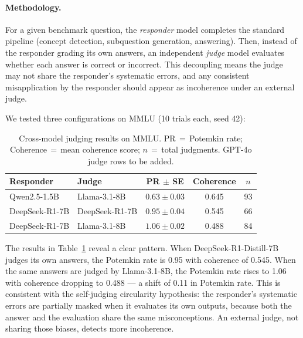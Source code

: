 \documentclass[sigconf,authordraft]{acmart}
\begin{document}
\paragraph{Methodology.} For a given benchmark question, the \emph{responder} model completes the standard pipeline (concept detection, subquestion generation, answering). Then, instead of the responder grading its own answers, an independent \emph{judge} model evaluates whether each answer is correct or incorrect. This decoupling means the judge may not share the responder's systematic errors, and any consistent misapplication by the responder should appear as incoherence under an external judge.

We tested three configurations on MMLU (10 trials each, seed 42):

\begin{table}[t]
\centering
\small
\setlength{\tabcolsep}{3pt}
\renewcommand{\arraystretch}{1.15}
\begin{tabular}{l l c c c}
\toprule
\textbf{Responder} & \textbf{Judge} & \textbf{PR $\pm$ SE} & \textbf{Coherence} & \textbf{$n$} \\
\midrule
Qwen2.5-1.5B & Llama-3.1-8B & $0.63 \pm 0.03$ & 0.645 & 93 \\
DeepSeek-R1-7B & DeepSeek-R1-7B & $0.95 \pm 0.04$ & 0.545 & 66 \\
DeepSeek-R1-7B & Llama-3.1-8B & $1.06 \pm 0.02$ & 0.488 & 84 \\
\midrule
\bottomrule
\end{tabular}
\caption{Cross-model judging results on MMLU. PR\,$=$\,Potemkin rate; Coherence\,$=$\,mean coherence score; $n$\,$=$\,total judgments. GPT-4o judge rows to be added.}
\label{tab:cross-judge}
\end{table}

The results in Table~\ref{tab:cross-judge} reveal a clear pattern. When DeepSeek-R1-Distill-7B judges its own answers, the Potemkin rate is 0.95 with coherence of 0.545. When the same answers are judged by Llama-3.1-8B, the Potemkin rate rises to 1.06 with coherence dropping to 0.488 --- a shift of 0.11 in Potemkin rate. This is consistent with the self-judging circularity hypothesis: the responder's systematic errors are partially masked when it evaluates its own outputs, because both the answer and the evaluation share the same misconceptions. An external judge, not sharing those biases, detects more incoherence.
\end{document}
